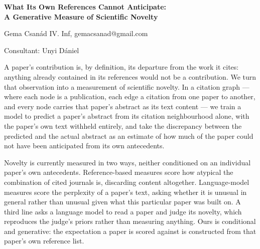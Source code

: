 \documentclass[12pt]{article}
\begin{document}
\begin{center}
    {\Large\bfseries What Its Own References Cannot Anticipate: \\
    A Generative Measure of Scientific Novelty}
\end{center}

\vspace{0.8em}

\begin{center}
    Gema Csanád IV. Inf, gemacsanad@gmail.com \\

\end{center}

\vspace{0.4em}

\begin{center}
    Consultant: Unyi Dániel
\end{center}

\vspace{1.2em}


A paper's contribution is, by definition, its departure from the work
it cites: anything already contained in its references would not be a
contribution. We turn that observation into a measurement of
scientific novelty. In a citation graph — where each node is a
publication, each edge a citation from one paper to another, and
every node carries that paper's abstract as its text content — we
train a model to predict a paper's abstract from its citation
neighbourhood alone, with the paper's own text withheld entirely, and
take the discrepancy between the predicted and the actual abstract as
an estimate of how much of the paper could not have been anticipated
from its own antecedents.

Novelty is currently measured in two ways, neither conditioned on an
individual paper's own antecedents. Reference-based measures score
how atypical the combination of cited journals is, discarding content
altogether. Language-model measures score the perplexity of a paper's
text, asking whether it is unusual in general rather than unusual
given what this particular paper was built on. A third line asks a
language model to read a paper and judge its novelty, which
reproduces the judge's priors rather than measuring anything. Ours is
conditional and generative: the expectation a paper is scored against
is constructed from that paper's own reference list.
\end{document}

